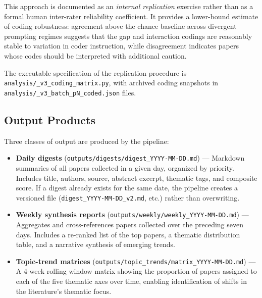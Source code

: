 This approach is documented as an \textit{internal replication}
exercise rather than as a formal human inter-rater reliability
coefficient. It provides a lower-bound estimate of coding robustness:
agreement above the chance baseline across divergent prompting regimes
suggests that the gap and interaction codings are reasonably stable
to variation in coder instruction, while disagreement indicates
papers whose codes should be interpreted with additional caution.

The executable specification of the replication procedure is
\texttt{analysis/\_v3\_coding\_matrix.py}, with archived coding
snapshots in \texttt{analysis/\_v3\_batch\_pN\_coded.json} files.


\subsection{Output Products}
\label{sec:app_outputs}

Three classes of output are produced by the pipeline:

\begin{itemize}
\item \textbf{Daily digests} (\texttt{outputs/digests/digest\_YYYY-MM-DD.md}) —
  Markdown summaries of all papers collected in a given day, organized by
  priority. Includes title, authors, source, abstract excerpt, thematic tags,
  and composite score. If a digest already exists for the same date, the
  pipeline creates a versioned file (\texttt{digest\_YYYY-MM-DD\_v2.md}, etc.)
  rather than overwriting.

\item \textbf{Weekly synthesis reports} (\texttt{outputs/weekly/weekly\_YYYY-MM-DD.md})
  — Aggregates and cross-references papers collected over the preceding seven
  days. Includes a re-ranked list of the top papers, a thematic distribution
  table, and a narrative synthesis of emerging trends.

\item \textbf{Topic-trend matrices} (\texttt{outputs/topic\_trends/matrix\_YYYY-MM-DD.md})
  — A 4-week rolling window matrix showing the proportion of papers assigned
  to each of the five thematic axes over time, enabling identification of
  shifts in the literature's thematic focus.
\end{itemize}

